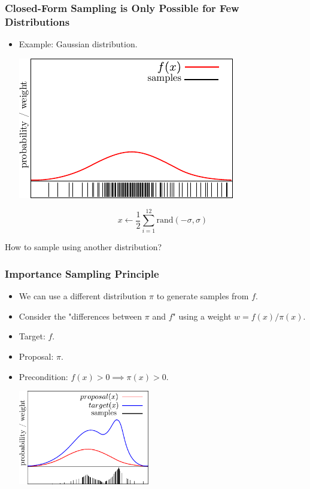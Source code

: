 \begin{frame}
    \frametitle{Closed-Form Sampling is Only Possible for Few Distributions}
    \begin{itemize}
        \item Example: Gaussian distribution.
        \begin{center}
            \includegraphics[width=0.5\columnwidth]{./images/particle_filter/gaussian_approximation_by_sampling.pdf}
        \end{center}
        \begin{equation*}
            x \leftarrow \frac{1}{2} \sum_{i=1}^{12} \text{rand}(-\sigma, \sigma)
        \end{equation*}
    \end{itemize}
    How to sample using another distribution?
\end{frame}

\begin{frame}
    \frametitle{Importance Sampling Principle}
    \begin{itemize}
        \item We can use a different distribution $\pi$ to generate samples from $f$.
        \item Consider the "differences between $\pi$ and $f$" using a weight $w = f(x) / \pi(x)$.
        \item Target: $f$.
        \item Proposal: $\pi$.
        \item Precondition: $f(x) > 0 \implies \pi(x) > 0$.
        \begin{center}
            \includegraphics[width=0.45\textwidth]{./images/particle_filter/importance_sampling_principle.pdf}
        \end{center}
    \end{itemize}
\end{frame}

